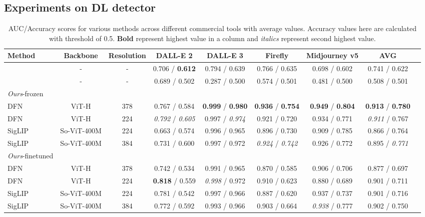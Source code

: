 \subsection{Experiments on DL detector}
\label{subsec:exp_dl}
\begin{table}[t]
\centering
\begin{adjustbox}{width=0.95\linewidth}  
\setlength{\tabcolsep}{6pt} %
\begin{tabular}{lcccccccc}
\toprule
{Method} & {Backbone} & {Resolution} & DALL-E 2 & DALL-E 3 & Firefly & Midjourney v5   & {AVG} \\ 

\midrule
\citet{cozzolino2024raising} & - & - & 0.706 / \textbf{0.612} & 0.794 / 0.639 & 0.766 / 0.635 & 0.698 / 0.602 & 0.741 / 0.622 \\
\citet{corvi2023detection} & - & - &  0.689 / 0.502 & 0.287 / 0.500 & 0.574 / 0.501 & 0.481 / 0.500 & 0.508 / 0.501 \\
\midrule
\textit{Ours}-frozen \\
\midrule
DFN \cite{fang2023data} & ViT-H & 378 & 0.767 / 0.584 & \textbf{0.999} / \textbf{0.980} & \textbf{0.936} / \textbf{0.754} & \textbf{0.949} / \textbf{0.804} & \textbf{0.913} / \textbf{0.780} \\
DFN \cite{fang2023data} & ViT-H & 224& \textit{0.792} / \textit{0.605} & 0.997 / \textit{0.974} & 0.921 / 0.720 & 0.934 / 0.771 & \textit{0.911} / 0.767 \\
SigLIP\cite{zhai2023sigmoid} & So-ViT-400M & 224 & 0.663 / 0.574 & 0.996 / 0.965 & 0.896 / 0.730 & 0.909 / 0.785 & 0.866 / 0.764 \\
SigLIP\cite{zhai2023sigmoid} & So-ViT-400M & 384 & 0.731 / 0.600 & 0.997 / 0.972 & \textit{0.924} / \textit{0.742} & 0.926 / 0.772 & 0.895 / \textit{0.771} \\
\midrule
\textit{Ours}-finetuned \\
\midrule
DFN \cite{fang2023data} & ViT-H & 378 & 0.742 / 0.534 & 0.991 / 0.965 & 0.870 / 0.585 & 0.906 / 0.706 & 0.877 / 0.697 \\
DFN \cite{fang2023data} & ViT-H & 224 & \textbf{0.818} / 0.559 & \textit{0.998} / 0.972 & 0.910 / 0.623 & 0.880 / 0.689 & 0.901 / 0.711 \\
SigLIP\cite{zhai2023sigmoid} & So-ViT-400M & 224 & 0.781 / 0.542 & 0.997 / 0.966 & 0.887 / 0.620 & 0.937 / 0.737 & 0.901 / 0.716 \\
SigLIP\cite{zhai2023sigmoid} & So-ViT-400M & 384 & 0.772 / 0.592 & 0.993 / 0.966 & 0.903 / 0.664 & \textit{0.938} / 0.777 & 0.902 / 0.750 \\
\bottomrule
\end{tabular}
\end{adjustbox}
\caption{AUC/Accuracy scores for various methods across different commercial tools with average values. Accuracy values here are calculated with threshold of 0.5. \textbf{Bold} represent highest value in a column and \textit{italics} represent second highest value.}
\label{tab:auc_acc_table}
\end{table}


